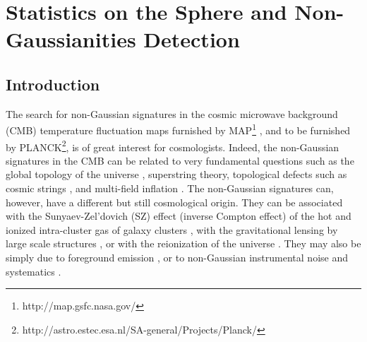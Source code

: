 \chapter{Statistics on the Sphere and Non-Gaussianities Detection}
\section{Introduction}
The search for non-Gaussian signatures in the cosmic microwave background (CMB) temperature fluctuation maps furnished by
MAP\footnote{http://map.gsfc.nasa.gov/} \cite{komatsu2003}, and to be furnished by PLANCK\footnote{http://astro.estec.esa.nl/SA-general/Projects/Planck/},
is of great interest for cosmologists. Indeed, the non-Gaussian signatures in the CMB can be related to very fundamental questions
such as the global topology of the universe \cite{riazuelo2002}, superstring theory, topological defects such as cosmic strings
\cite{bouchet88}, and multi-field inflation \cite{bernardeau2002}. The non-Gaussian signatures can, however, have a different 
but still cosmological origin. They can be associated with the Sunyaev-Zel'dovich (SZ) effect \cite{sunyaev80} (inverse Compton
effect) of the hot and ionized intra-cluster gas of galaxy clusters \cite{gauss:aghanim99,cooray2001}, with the gravitational 
lensing by large scale structures \cite{bernardeau2003}, or with the reionization of the universe \cite{gauss:aghanim99,castro2002}. 
They may also be simply due to foreground emission \cite{gauss:jewell01}, or to non-Gaussian instrumental noise and systematics \cite{banday2000}.

